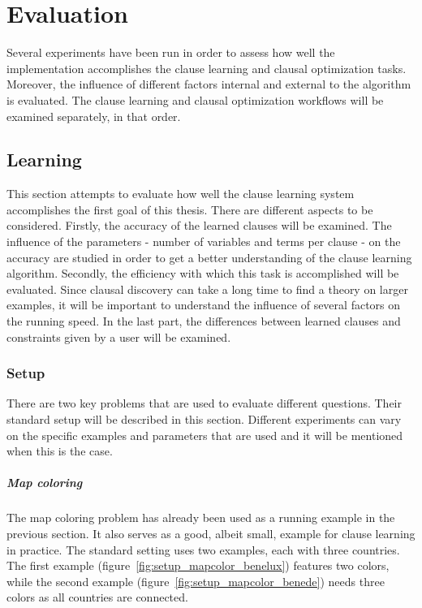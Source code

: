 \chapter{Evaluation}
\label{cha:evaluation}

Several experiments have been run in order to assess how well the implementation accomplishes the clause learning and clausal optimization tasks.
Moreover, the influence of different factors internal and external to the algorithm is evaluated.
The clause learning and clausal optimization workflows will be examined separately, in that order.

\section{Learning}

This section attempts to evaluate how well the clause learning system accomplishes the first goal of this thesis.
There are different aspects to be considered.
Firstly, the accuracy of the learned clauses will be examined.
The influence of the parameters - number of variables and terms per clause - on the accuracy are studied in order to get a better understanding of the clause learning algorithm.
Secondly, the efficiency with which this task is accomplished will be evaluated.
Since clausal discovery can take a long time to find a theory on larger examples, it will be important to understand the influence of several factors on the running speed.
In the last part, the differences between learned clauses and constraints given by a user will be examined.

\subsection{Setup}
There are two key problems that are used to evaluate different questions.
Their standard setup will be described in this section.
Different experiments can vary on the specific examples and parameters that are used and it will be mentioned when this is the case.

\paragraph{Map coloring}
The map coloring problem has already been used as a running example in the previous section.
It also serves as a good, albeit small, example for clause learning in practice.
The standard setting uses two examples, each with three countries.
The first example (figure~\ref{fig:setup_mapcolor_benelux}) features two colors, while the second example (figure~\ref{fig:setup_mapcolor_benede}) needs three colors as all countries are connected.


